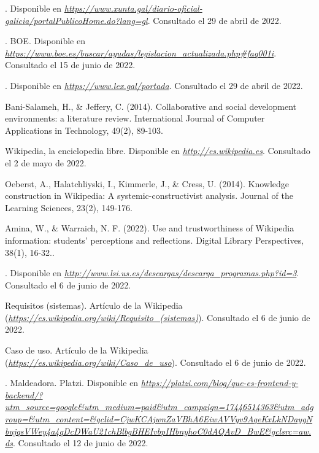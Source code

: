 

\begin{thebibliography}{99}

. Disponible en {\it \url{https://www.xunta.gal/diario-oficial-galicia/portalPublicoHome.do?lang=gl}}. Consultado el 29 de abril de 2022.

. BOE. Disponible en {\it \url{https://www.boe.es/buscar/ayudas/legislacion_actualizada.php#faq001i}}. Consultado el 15 de junio de 2022.

. Disponible en {\it \url{https://www.lex.gal/portada}}. Consultado el 29 de abril de 2022.

 Bani-Salameh, H., \& Jeffery, C. (2014). Collaborative and social development environments: a literature review. International Journal of Computer Applications in Technology, 49(2), 89-103.

 Wikipedia, la enciclopedia libre. Disponible en {\it \url{http://es.wikipedia.es}}. Consultado el 2 de mayo de 2022.

 Oeberst, A., Halatchliyski, I., Kimmerle, J., \& Cress, U. (2014). Knowledge construction in Wikipedia: A systemic-constructivist analysis. Journal of the Learning Sciences, 23(2), 149-176.

 Amina, W., \& Warraich, N. F. (2022). Use and trustworthiness of Wikipedia information: students’ perceptions and reflections. Digital Library Perspectives, 38(1), 16-32..

. Disponible en {\it \url{http://www.lsi.us.es/descargas/descarga_programas.php?id=3}}. Consultado el 6 de junio de 2022.

 Requisitos (sistemas). Artículo de la Wikipedia ({\it \url{https://es.wikipedia.org/wiki/Requisito_(sistemas)}}). Consultado el 6 de junio de 2022.

 Caso de uso. Artículo de la Wikipedia ({\it \url{https://es.wikipedia.org/wiki/Caso_de_uso}}). Consultado el 6 de junio de 2022.

. Maldeadora. Platzi. Disponible en {\it \url{https://platzi.com/blog/que-es-frontend-y-backend/?utm_source=google&utm_medium=paid&utm_campaign=17446514363&utm_adgroup=&utm_content=&gclid=CjwKCAjwnZaVBhA6EiwAVVyv9AqeKxLkNDaygNbujqsVWey4a4qDcDWaU21chBlbgBHEIvbpIHbnyhoC0dAQAvD_BwE&gclsrc=aw.ds}}. Consultado el 12 de junio de 2022.


\end{thebibliography}
